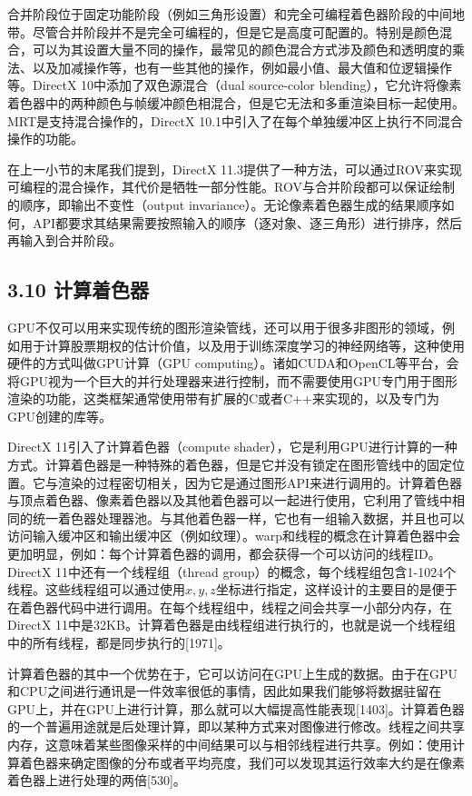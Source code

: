 \documentclass[
  paper=a4,
  ,captions=tableheading
]{scrartcl}
\begin{document}
合并阶段位于固定功能阶段（例如三角形设置）和完全可编程着色器阶段的中间地带。尽管合并阶段并不是完全可编程的，但是它是高度可配置的。特别是颜色混合，可以为其设置大量不同的操作，最常见的颜色混合方式涉及颜色和透明度的乘法、以及加减操作等，也有一些其他的操作，例如最小值、最大值和位逻辑操作等。DirectX
10中添加了双色源混合（dual source-color
blending），它允许将像素着色器中的两种颜色与帧缓冲颜色相混合，但是它无法和多重渲染目标一起使用。MRT是支持混合操作的，DirectX
10.1中引入了在每个单独缓冲区上执行不同混合操作的功能。

在上一小节的末尾我们提到，DirectX
11.3提供了一种方法，可以通过ROV来实现可编程的混合操作，其代价是牺牲一部分性能。ROV与合并阶段都可以保证绘制的顺序，即输出不变性（output
invariance）。无论像素着色器生成的结果顺序如何，API都要求其结果需要按照输入的顺序（逐对象、逐三角形）进行排序，然后再输入到合并阶段。

\subsection{3.10 计算着色器}\label{ux8ba1ux7b97ux7740ux8272ux5668}

GPU不仅可以用来实现传统的图形渲染管线，还可以用于很多非图形的领域，例如用于计算股票期权的估计价值，以及用于训练深度学习的神经网络等，这种使用硬件的方式叫做GPU计算（GPU
computing）。诸如CUDA和OpenCL等平台，会将GPU视为一个巨大的并行处理器来进行控制，而不需要使用GPU专门用于图形渲染的功能，这类框架通常使用带有扩展的C或者C++来实现的，以及专门为GPU创建的库等。 

DirectX 11引入了计算着色器（compute
shader），它是利用GPU进行计算的一种方式。计算着色器是一种特殊的着色器，但是它并没有锁定在图形管线中的固定位置。它与渲染的过程密切相关，因为它是通过图形API来进行调用的。计算着色器与顶点着色器、像素着色器以及其他着色器可以一起进行使用，它利用了管线中相同的统一着色器处理器池。与其他着色器一样，它也有一组输入数据，并且也可以访问输入缓冲区和输出缓冲区（例如纹理）。warp和线程的概念在计算着色器中会更加明显，例如：每个计算着色器的调用，都会获得一个可以访问的线程ID。DirectX
11中还有一个线程组（thread
group）的概念，每个线程组包含1-1024个线程。这些线程组可以通过使用\(x,y,z\)坐标进行指定，这样设计的主要目的是便于在着色器代码中进行调用。在每个线程组中，线程之间会共享一小部分内存，在DirectX
11中是32KB。计算着色器是由线程组进行执行的，也就是说一个线程组中的所有线程，都是同步执行的{[}1971{]}。

计算着色器的其中一个优势在于，它可以访问在GPU上生成的数据。由于在GPU和CPU之间进行通讯是一件效率很低的事情，因此如果我们能够将数据驻留在GPU上，并在GPU上进行计算，那么就可以大幅提高性能表现{[}1403{]}。计算着色器的一个普遍用途就是后处理计算，即以某种方式来对图像进行修改。线程之间共享内存，这意味着某些图像采样的中间结果可以与相邻线程进行共享。例如：使用计算着色器来确定图像的分布或者平均亮度，我们可以发现其运行效率大约是在像素着色器上进行处理的两倍{[}530{]}。
\end{document}
